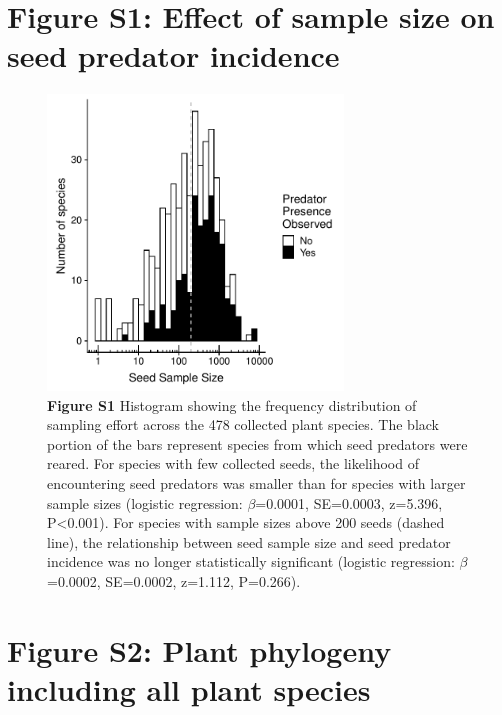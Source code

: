 \documentclass[11pt]{article}
\begin{document}
\newpage

\section{Figure S1: Effect of sample size on seed predator incidence}


\begin{figure}[H]
\centering\includegraphics[width=0.7\textwidth]{../Figures/FigureS1.pdf} 
\caption[]{\textbf{Figure S1} Histogram showing the frequency distribution of sampling effort across the 478 collected plant species. The black portion of the bars represent species from which seed predators were reared. For species with few collected seeds, the likelihood of encountering seed predators was smaller than for species with larger sample sizes (logistic regression: $\beta$=0.0001, SE=0.0003, z=5.396, P<0.001). For species with sample sizes above 200 seeds (dashed line), the relationship between seed sample size and seed predator incidence was no longer statistically significant (logistic regression: $\beta$=0.0002, SE=0.0002, z=1.112, P=0.266).}
\end{figure}

\newpage

\section{Figure S2: Plant phylogeny including all plant species}
\end{document}
